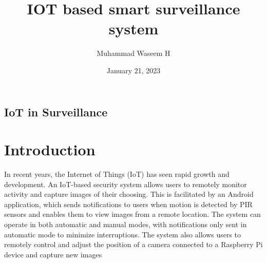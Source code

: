 \documentclass{report}
\title{IOT based smart surveillance system}
\author{Muhammad Waseem H}
\date{January 21, 2023}
\begin{document}
    
    
    \begin{center}
        \section*{IoT in Surveillance}
    \end{center}
\setlength{\columnsep}{1.0cm}
    \large
    \section*{Introduction}
    In recent years, the Internet of Things (IoT) has seen rapid growth and development. An IoT-based security system allows users to remotely monitor activity and capture images of their choosing. This is facilitated by an Android application, which sends notifications to users when motion is detected by PIR sensors and enables them to view images from a remote location. The system can operate in both automatic and manual modes, with notifications only sent in automatic mode to minimize interruptions. The system also allows users to remotely control and adjust the position of a camera connected to a Raspberry Pi device and capture new images
    
\end{document}
